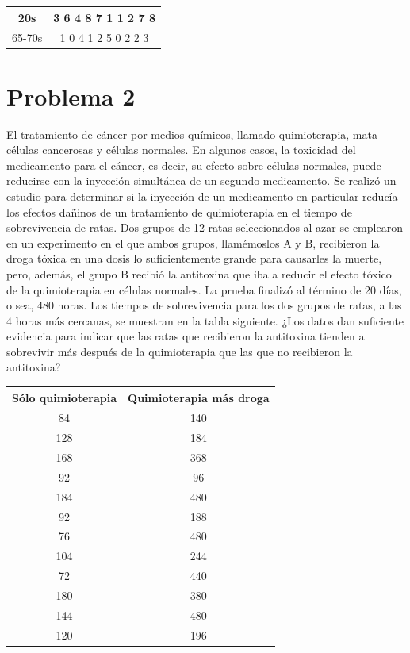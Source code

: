 \documentclass{article}
\begin{document}
\begin{center}
    \begin{tabular}{c|c}
        20s    & 3 6 4 8 7 1 1 2 7 8 \\
        \hline
        65-70s & 1 0 4 1 2 5 0 2 2 3
    \end{tabular}
\end{center}

\section{Problema 2}

El tratamiento de cáncer por medios químicos, llamado quimioterapia, mata células cancerosas y células normales. En algunos casos, la toxicidad del medicamento para el cáncer, es decir, su efecto sobre células normales, puede reducirse con la inyección simultánea de un segundo medicamento. Se realizó un estudio para determinar si la inyección de un medicamento en particular reducía los efectos dañinos de un tratamiento de quimioterapia en el tiempo de sobrevivencia de ratas. Dos grupos de 12 ratas seleccionados al azar se emplearon en un experimento en el que ambos grupos, llamémoslos A y B, recibieron la droga tóxica en una dosis lo suficientemente grande para causarles la muerte, pero, además, el grupo B recibió la antitoxina que iba a reducir el efecto tóxico de la quimioterapia en células normales. La prueba finalizó al término de 20 días, o sea, 480 horas. Los tiempos de sobrevivencia para los dos grupos de ratas, a las 4 horas más cercanas, se muestran en la tabla siguiente. ¿Los datos dan suficiente evidencia para indicar que las ratas que recibieron la antitoxina tienden a sobrevivir más después de la quimioterapia que las que no recibieron la antitoxina?

\begin{center}
    \begin{tabular}{c c}
        Sólo quimioterapia & Quimioterapia más droga \\
        \hline
        84                 & 140                     \\
        128                & 184                     \\
        168                & 368                     \\
        92                 & 96                      \\
        184                & 480                     \\
        92                 & 188                     \\
        76                 & 480                     \\
        104                & 244                     \\
        72                 & 440                     \\
        180                & 380                     \\
        144                & 480                     \\
        120                & 196                     \\
    \end{tabular}
\end{center}
\end{document}
